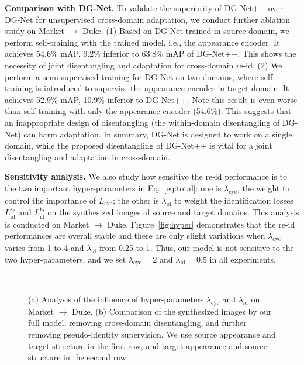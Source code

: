 \documentclass[runningheads]{llncs}
\begin{document}
\noindent\textbf{Comparison with DG-Net.} To validate the superiority of DG-Net++ over DG-Net for unsupervised cross-domain adaptation, we conduct further ablation study on Market $\rightarrow$ Duke. (1) Based on DG-Net trained in source domain, we perform self-training with the trained model, i.e., the appearance encoder. It achieves 54.6\% mAP, 9.2\% inferior to 63.8\% mAP of DG-Net++. This shows the necessity of joint disentangling and adaptation for cross-domain re-id. (2) We perform a semi-supervised training for DG-Net on two domains, where self-training is introduced to supervise the appearance encoder in target domain. It achieves 52.9\% mAP, 10.9\% inferior to DG-Net++. Note this result is even worse than self-training with only the appearance encoder (54.6\%). This suggests that an inappropriate design of disentangling (the within-domain disentangling of DG-Net) can harm adaptation. In summary, DG-Net is designed to work on a single domain, while the proposed disentangling of DG-Net++ is vital for a joint disentangling and adaptation in cross-domain.



\noindent\textbf{Sensitivity analysis.} We also study how sensitive the re-id performance is to the two important hyper-parameters in Eq.~\ref{eq:total}: one is $\lambda_{\mathrm{cyc}}$, the weight to control the importance of $L_{\mathrm{cyc}}$; the other is $\lambda_{\mathrm{id}}$ to weight the identification losses $L^{\mathrm{s_2}}_{\mathrm{id}}$ and $L^{\mathrm{t_2}}_{\mathrm{id}}$ on the synthesized images of source and target domains. This analysis is conducted on Market $\rightarrow$ Duke. Figure~\ref{fig:hyper} demonstrates that the re-id performances are overall stable and there are only slight variations when $\lambda_{\mathrm{cyc}}$ varies from 1 to 4 and $\lambda_{\mathrm{id}}$ from 0.25 to 1. Thus, our model is not sensitive to the two hyper-parameters, and we set $\lambda_{\mathrm{cyc}} = 2$ and $\lambda_{\mathrm{id}} = 0.5$ in all experiments.

\begin{figure}
\centering     {}~~
\vspace{-.35cm}
\caption{(a) Analysis of the influence of hyper-parameters $\lambda_{\mathrm{cyc}}$ and $\lambda_{\mathrm{id}}$ on Market $\rightarrow$ Duke. (b) Comparison of the synthesized images by our full model, removing cross-domain disentangling, and further removing pseudo-identity supervision. We use source appearance and target structure in the first row, and target appearance and source structure in the second row.}
\vspace{-10pt}
\end{figure}
\end{document}
